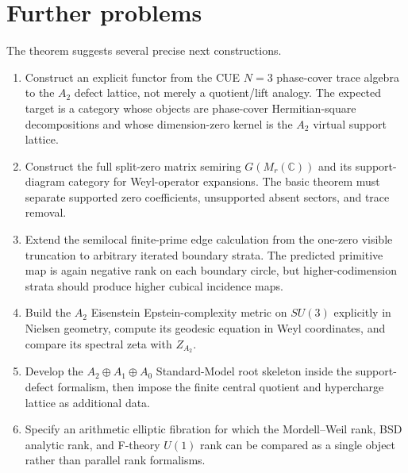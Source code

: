 \documentclass[11pt]{article}
\theoremstyle{remark}
\newcommand{\CC}{\mathbb C}
\begin{document}
\section{Further problems}

The theorem suggests several precise next constructions.

\begin{enumerate}[label=(\arabic*)]
\item Construct an explicit functor from the CUE $N=3$ phase-cover trace algebra to the $A_2$ defect lattice, not merely a quotient/lift analogy.  The expected target is a category whose objects are phase-cover Hermitian-square decompositions and whose dimension-zero kernel is the $A_2$ virtual support lattice.

\item Construct the full split-zero matrix semiring $G(M_r(\CC))$ and its support-diagram category for Weyl-operator expansions.  The basic theorem must separate supported zero coefficients, unsupported absent sectors, and trace removal.

\item Extend the semilocal finite-prime edge calculation from the one-zero visible truncation to arbitrary iterated boundary strata.  The predicted primitive map is again negative rank on each boundary circle, but higher-codimension strata should produce higher cubical incidence maps.

\item Build the $A_2$ Eisenstein Epstein-complexity metric on $SU(3)$ explicitly in Nielsen geometry, compute its geodesic equation in Weyl coordinates, and compare its spectral zeta with $Z_{A_2}$.

\item Develop the $A_2\oplus A_1\oplus A_0$ Standard-Model root skeleton inside the support-defect formalism, then impose the finite central quotient and hypercharge lattice as additional data.

\item Specify an arithmetic elliptic fibration for which the Mordell--Weil rank, BSD analytic rank, and F-theory $U(1)$ rank can be compared as a single object rather than parallel rank formalisms.
\end{enumerate}
\end{document}
